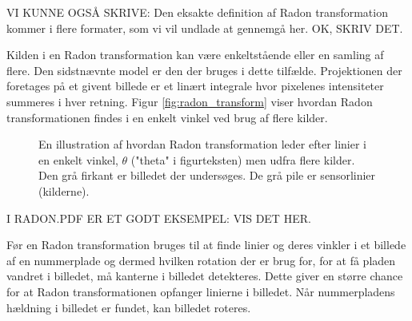 VI KUNNE OGSÅ SKRIVE: Den eksakte definition af Radon transformation kommer i flere formater, som vi vil undlade at gennemgå her. OK, SKRIV DET.


Kilden i en Radon transformation kan være enkeltstående eller en samling af flere. Den sidstnævnte model er den der bruges i dette tilfælde. Projektionen der foretages på et givent billede er et linært integrale hvor pixelenes intensiteter summeres i hver retning. Figur \vref{fig:radon_transform} viser hvordan Radon transformationen findes i en enkelt vinkel ved brug af flere kilder.

\begin{figure}[htp]
  \centering
  \caption{En illustration af hvordan Radon transformation leder efter linier i en enkelt vinkel, $\theta$ ("theta" i figurteksten) men udfra flere kilder. Den grå firkant er billedet der undersøges. De grå pile er sensorlinier (kilderne).\cite{matlab_radon}}
  \label{fig:radon_transform}
\end{figure}

I RADON.PDF ER ET GODT EKSEMPEL: VIS DET HER.

Før en Radon transformation bruges til at finde linier og deres vinkler i et billede af en nummerplade og dermed hvilken rotation der er brug for, for at få pladen vandret i billedet, må kanterne i billedet detekteres. Dette giver en større chance for at Radon transformationen opfanger linierne i billedet. Når nummerpladens hældning i billedet er fundet, kan billedet roteres.

